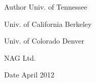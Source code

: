 \begin{DoxyAuthor}{Author}
Univ. of Tennessee 

Univ. of California Berkeley 

Univ. of Colorado Denver 

N\+A\+G Ltd. 
\end{DoxyAuthor}
\begin{DoxyDate}{Date}
April 2012 
\end{DoxyDate}
